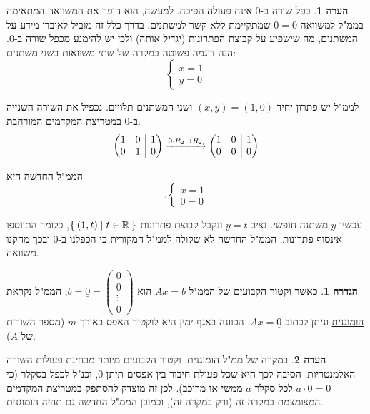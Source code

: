\documentclass[12pt]{report}
\theoremstyle{plain}
\theoremstyle{definition}
\newtheorem{definition}[theorem]{הגדרה}
\newtheorem{remark}{הערה}[chapter]
\newcommand{\R}{\mathbb{R}}
\newcommand{\0}{\mathbf{0}}
\begin{document}
\begin{remark}
כפל שורה ב-$0$ אינה פעולה הפיכה. למעשה, הוא הופך את המשוואה
המתאימה בממ"ל למשוואה
$0=0$
שמתקיימת ללא קשר למשתנים. בדרך כלל זה מוביל לאובדן מידע על המשתנים, מה שישפיע על קבוצת הפתרונות (יגדיל אותה) ולכן יש להימנע מכפל
שורה ב-$0$. הנה דוגמה פשוטה במקרה של שתי משוואות בשני משתנים:
$$
\begin{cases}
x=1\\
y=0
\end{cases}
$$

לממ"ל יש פתרון יחיד
$(x,y)=(1,0)$
ושני המשתנים תלויים. נכפיל את השורה השנייה ב-$0$ במטריצת המקדמים המורחבת:
$$
\left( \begin{array}{@{}cc|c@{}}
1 & 0 & 1\\
0 & 1 & 0
\end{array}\right) \xrightarrow{0\cdot R_2\to R_2}
	\left( \begin{array}{@{}cc|c@{}}
	1 & 0 & 1\\
	0 & 0 & 0
\end{array} \right)
$$

הממ"ל החדשה היא
$$
.\begin{cases}
x=1\\
0=0
\end{cases}
$$

עכשיו $y$ משתנה חופשי. נציב $y=t$ ונקבל קבוצת פתרונות $\Set{(1,t)|t\in\R}$,
כלומר התווספו אינסוף פתרונות. הממ"ל החדשה לא שקולה לממ"ל
המקורית כי הכפלנו ב-$0$ ובכך מחקנו משוואה.
\end{remark}

\begin{definition}
כאשר וקטור הקבועים של הממ"ל 
$Ax=b$
הוא
$b=\underline{0}=\begin{pmatrix}0\\
0\\
\vdots\\
0
\end{pmatrix}$,
הממ"ל נקראת
\underline{הומוגנית}
וניתן לכתוב $Ax=\underline{0}$.
הכוונה באגף ימין היא לוקטור האפס באורך
$m$ (מספר השורות של $A$).
\end{definition}

\begin{remark}
במקרה של ממ"ל הומוגנית, וקטור הקבועים מיותר מבחינת פעולות השורה האלמנטריות. הסיבה לכך היא שכל פעולת חיבור בין אפסים תיתן 0, וכנ"ל לכפל בסקלר (כי 
$a\cdot 0=0$
לכל סקלר
$a$
ממשי או מרוכב). לכן זה מוצדק להסתפק במטריצת המקדמים המצומצמת במקרה זה (ורק במקרה זה), וכמובן הממ"ל החדשה גם תהיה הומוגנית.
\end{remark}
\end{document}
